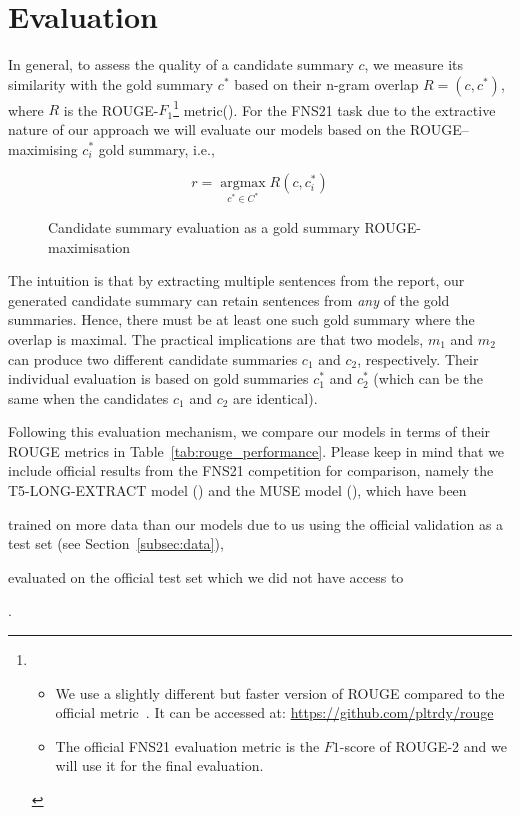 \section{Evaluation}\label{sec:evaluation}

In general, to assess the quality of a candidate summary $c$, we measure its similarity with the gold summary $c^{*}$
based on their n-gram overlap $R=(c, c^{*})$, where $R$ is the ROUGE-$F_{1}$\footnote{
    \begin{itemize}
        \item We use a slightly different but faster version of ROUGE compared to the official metric~\cite{lin2004rouge}.
              It can be accessed at: \url{https://github.com/pltrdy/rouge}
        \item The official FNS21 evaluation metric is the $F1$-score of ROUGE-2 and we will use it for the final evaluation.
    \end{itemize}
} metric(\cite{lin2004rouge}).
For the FNS21 task due to the extractive nature of our approach we will evaluate our models based on
the ROUGE--maximising $c^{*}_{i}$ gold summary, i.e.,

\begin{figure}[h]
    \centering
    \begin{equation}\label{eq:rouge_max}
        r = \underset{c^{*} \in C^{*}}{\operatorname{argmax}} R(c, c^{*}_{i})
    \end{equation}
    \caption{Candidate summary evaluation as a gold summary ROUGE-maximisation}
    \label{fig:rouge_max}
\end{figure}

The intuition is that by extracting multiple sentences from the report, our generated candidate summary can
retain sentences from \emph{any} of the gold summaries.
Hence, there must be at least one such gold summary where the overlap is maximal.
The practical implications are that two models, $m_{1}$ and $m_{2}$ can produce two different candidate summaries
$c_{1}$ and $c_{2}$, respectively.
Their individual evaluation is based on gold summaries $c^{*}_{1}$ and $c^{*}_{2}$ (which can be the same when the
candidates $c_{1}$ and $c_{2}$ are identical).

Following this evaluation mechanism, we compare our models in terms of their ROUGE metrics in Table~\ref{tab:rouge_performance}.
Please keep in mind that we include official results from the FNS21 competition for comparison, namely the T5-LONG-EXTRACT model
(\cite{orzhenovskii-2021-t5}) and the MUSE model (\cite{litvak-last-2013-multilingual}), which have been
\begin{enumerate*}
    \item trained on more data than our models due to us using the official validation as a test set (see Section~\ref{subsec:data}),
    \item evaluated on the official test set which we did not have access to
\end{enumerate*}.

